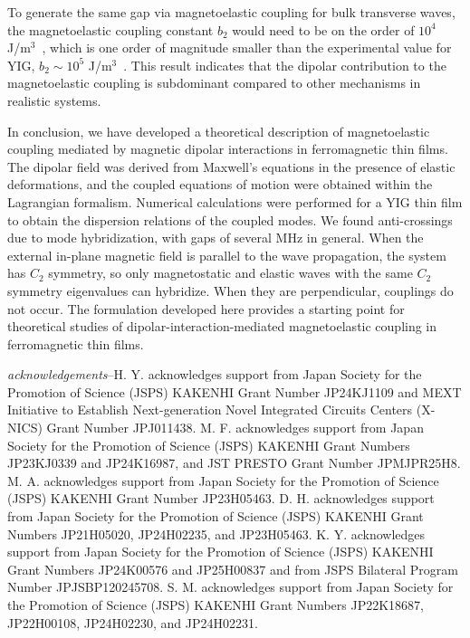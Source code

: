 \documentclass[aps,prb,10pt,amsmath,amssymb,twocolumn,longbibliography,superscriptaddress]{revtex4-2}
\begin{document}
To generate the same gap via magnetoelastic coupling for bulk transverse waves, the magnetoelastic coupling constant $b_2$ would need to be on the order of $10^4$ J/m$^3$~\cite{Hioki2022}, which is one order of magnitude smaller than the experimental value for YIG, $b_2 \sim 10^5$ J/m$^3$~\cite{Krysztofik2021}. This result indicates that the dipolar contribution to the magnetoelastic coupling is subdominant compared to other mechanisms in realistic systems.

In conclusion, we have developed a theoretical description of magnetoelastic coupling mediated by magnetic dipolar interactions in ferromagnetic thin films. The dipolar field was derived from Maxwell's equations in the presence of elastic deformations, and the coupled equations of motion were obtained within the Lagrangian formalism. Numerical calculations were performed for a YIG thin film to obtain the dispersion relations of the coupled modes. We found anti-crossings due to mode hybridization, with gaps of several MHz in general. When the external in-plane magnetic field is parallel to the wave propagation, the system has $C_2$ symmetry, so only magnetostatic and elastic waves with the same $C_2$ symmetry eigenvalues can hybridize. When they are perpendicular, couplings do not occur. The formulation developed here provides a starting point for theoretical studies of dipolar-interaction-mediated magnetoelastic coupling in ferromagnetic thin films.

\textit{acknowledgements}--H. Y. acknowledges support from Japan Society for the Promotion of Science (JSPS) KAKENHI Grant Number JP24KJ1109 and MEXT Initiative to Establish Next-generation Novel Integrated Circuits Centers (X-NICS) Grant Number JPJ011438. 
M. F. acknowledges support from Japan Society for the Promotion of Science (JSPS) KAKENHI Grant Numbers JP23KJ0339 and JP24K16987, and JST PRESTO Grant Number JPMJPR25H8. 
M. A. acknowledges support from Japan Society for the Promotion of Science (JSPS) KAKENHI Grant Number JP23H05463. 
D. H. acknowledges support from Japan Society for the Promotion of Science (JSPS) KAKENHI Grant Numbers JP21H05020, JP24H02235, and JP23H05463. 
K. Y. acknowledges support from Japan Society for the Promotion of Science (JSPS) KAKENHI Grant Numbers JP24K00576 and JP25H00837 and from JSPS Bilateral Program Number JPJSBP120245708. 
S. M. acknowledges support from Japan Society for the Promotion of Science (JSPS) KAKENHI Grant Numbers JP22K18687, JP22H00108, JP24H02230, and JP24H02231.




\end{document}
